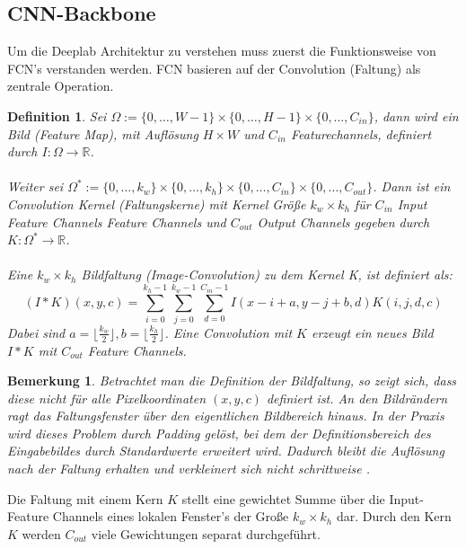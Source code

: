 \documentclass[12pt,DIV=15,BCOR=15mm,twoside,headsepline,abstract=true,listof=totoc,bibliography=totoc]{scrreprt}
\newtheorem{remark}{Bemerkung}[chapter]
\newtheorem{defi}{Definition}
\theoremstyle{remark}    %
\begin{document}
    \subsection{CNN-Backbone}
    Um die Deeplab Architektur zu verstehen muss zuerst die Funktionsweise von \ac{FCN}'s verstanden werden.  
    \ac{FCN} basieren auf der Convolution (Faltung) als zentrale Operation. 
    \begin{defi}
    Sei $\Omega := \{0, \ldots , W-1\} \times \{ 0, \ldots, H-1\} \times  \{ 0, \ldots,C_{in}\}$, dann wird ein Bild (Feature Map), mit Auflösung $H\times W$ 
    und $C_{in}$ Featurechannels, definiert durch $I: \Omega \to \mathbb{R}$.\\\\
    Weiter sei $\Omega^* := \{0, \ldots , k_w\} \times \{ 0, \ldots, k_h\} \times \{0, \ldots, C_{in} \} \times  \{0, \ldots,C_{out}\} $. Dann ist ein 
    Convolution Kernel (Faltungskerne) mit Kernel Größe $k_w  \times k_h$ für $C_{in}$ Input Feature Channels Feature Channels und $C_{out}$ Output 
    Channels gegeben durch $K: \Omega^* \to \mathbb{R}$.\\\\
    Eine $k_w\times k_h$ Bildfaltung (Image-Convolution) zu dem Kernel K, ist definiert als:  
    \[
    (I * K)(x, y, c) = \sum_{i =0}^{k_h-1}\sum_{j=0}^{k_w-1} \sum_{d = 0}^{C_{in}-1}I(x-i +a, y-j+b, d)K(i,j,d,c)
    \]
    Dabei sind $a = \lfloor \frac{k_w}{2} \rfloor, b = \lfloor \frac{k_h}{2} \rfloor$. Eine Convolution mit $K$ erzeugt ein neues Bild $I * K$ 
    mit $C_{out}$ Feature Channels.\cite{pytorch_Convolution}
    \end{defi} 
    \begin{remark}
    Betrachtet man die Definition der Bildfaltung, so zeigt sich, dass diese nicht für alle Pixelkoordinaten 
    $(x,y,c)$ definiert ist. An den Bildrändern ragt das Faltungsfenster über den eigentlichen Bildbereich hinaus. In der Praxis wird dieses 
    Problem durch Padding gelöst, bei dem der Definitionsbereich des Eingabebildes durch Standardwerte erweitert wird. Dadurch bleibt die Auflösung 
    nach der Faltung erhalten und verkleinert sich nicht schrittweise \cite{pytorch_Convolution}.    
    \end{remark}\noindent
    Die Faltung mit einem Kern $K$ stellt eine gewichtet Summe über die Input-Feature Channels eines lokalen Fenster's der Große $k_w \times k_h$ dar. 
    Durch den Kern $K$ werden $C_{out}$ viele Gewichtungen separat durchgeführt.\\\\
\end{document}
